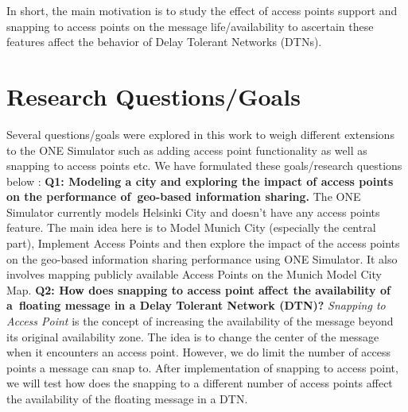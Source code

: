 In short, the main motivation is to study the effect of access points support and snapping to access points on the message life/availability to ascertain these features affect the behavior of Delay Tolerant Networks (DTNs).
\newpage
\section{Research Questions/Goals}
Several questions/goals were explored in this work to weigh different extensions to the ONE Simulator such as adding access point functionality as well as snapping to access points etc. We have formulated these goals/research questions below :\newline
\newline\textbf{Q1: Modeling a city and exploring the impact of access points on the performance of geo-based information sharing.}\newline
The ONE Simulator currently models Helsinki City and doesn't have any access points feature. The main idea here is to Model Munich City (especially the central part), Implement Access Points and then explore the impact of the access points on the geo-based information sharing performance using ONE Simulator. It also involves mapping publicly available Access Points on the Munich Model City Map.\newline
\newline\textbf{Q2: How does snapping to access point affect the availability of a floating message in a Delay Tolerant Network (DTN)?}\newline
\textit{Snapping to Access Point} is the concept of increasing the availability of the message beyond its original availability zone. The idea is to change the center of the message when it encounters an access point. However, we do limit the number of access points a message can snap to. After implementation of snapping to access point, we will test how does the snapping to a different number of access points affect the availability of the floating message in a DTN.
